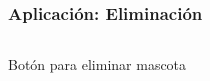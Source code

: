 \documentclass[14pt]{beamer}
\begin{document}
\begin{frame}
\frametitle{Aplicación: Eliminación}


\begin{columns}
\begin{column}{0.3\textwidth}
\begin{center}

\begin{small}
\caption{Botón para eliminar mascota}
\end{small}
\end{center}
\end{column}


\begin{column}{0.3\textwidth}
\begin{center}


\end{center}
\end{column}
\end{columns}
\end{frame}
\end{document}
